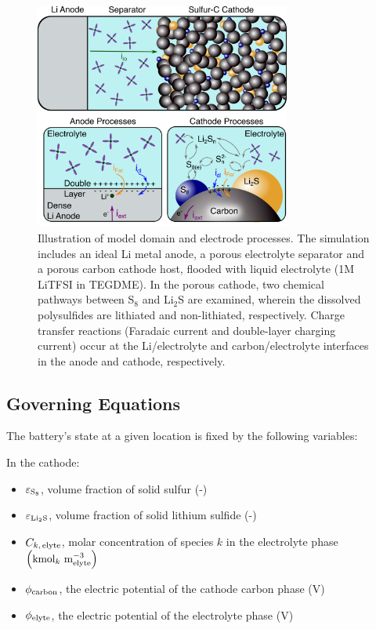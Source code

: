 \documentclass{elsarticle}
\begin{document}
\begin{figure}[t!]
    \centering
    \includegraphics[width=0.75\textwidth]{Figure1_Simulation_Domain.png}
    \caption{Illustration of model domain and electrode processes.  The simulation includes an ideal Li metal anode, a porous electrolyte separator and a porous carbon cathode host, flooded with liquid electrolyte (1M LiTFSI in TEGDME). In the porous cathode, two chemical pathways between S$_8$ and Li$_2$S are examined, wherein the dissolved polysulfides are lithiated and non-lithiated, respectively.  Charge transfer reactions (Faradaic current and double-layer charging current) occur at the Li/electrolyte and carbon/electrolyte interfaces in the anode and cathode, respectively.}
    \label{fig:modeldomain}
\end{figure}
\subsection{Governing Equations}
The battery’s state at a given location is fixed by the following variables:

In the cathode:
\begin{itemize}
    \item $\varepsilon_{\rm S_8}$, volume fraction of solid sulfur (-)
	\item $\varepsilon_{\rm Li_2S}$, volume fraction of solid lithium sulfide (-)
	\item $C_{k,\,{\rm elyte}}$, molar concentration of species $k$ in the electrolyte phase $\left({\rm kmol}_k ~ {\rm m_{elyte}^{-3}}\right)$
	\item $\phi_{\rm carbon}$, the electric potential of the cathode carbon phase (V)
	\item $\phi_{\rm elyte}$, the electric potential of the electrolyte phase (V)
\end{itemize}
\end{document}
